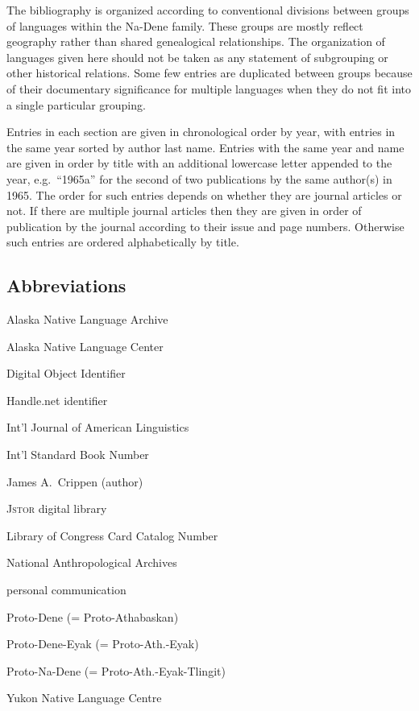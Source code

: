 \documentclass[12pt,letterpaper,oneside,article]{memoir}
\begin{document}
The bibliography is organized according to conventional divisions between groups of languages within the Na-Dene family.
These groups are mostly reflect geography rather than shared genealogical relationships.
The organization of languages given here should not be taken as any statement of subgrouping or other historical relations.
Some few entries are duplicated between groups because of their documentary significance for multiple languages when they do not fit into a single particular grouping.

Entries in each section are given in chronological order by year, with entries in the same year sorted by author last name.
Entries with the same year and name are given in order by title with an additional lowercase letter appended to the year, e.g.\ “1965a” for the second of two publications by the same author(s) in 1965.
The order for such entries depends on whether they are journal articles or not.
If there are multiple journal articles then they are given in order of publication by the journal according to their issue and page numbers.
Otherwise such entries are ordered alphabetically by title.

\subsection*{Abbreviations}
\begin{multicols}{2}\small\raggedyright
\begin{description}
	[font=\normalfont,
	leftmargin=3.5em,
	style=sameline,
	partopsep=0pt,
	parsep=0pt,
	itemsep=0pt]
\item[ANLA]		Alaska Native Language Archive
\item[ANLC]		Alaska Native Language Center
\item[DOI]		Digital Object Identifier
\item[HDL]		Handle.net identifier
\item[IJAL]		Int’l Journal of American Linguistics
\item[ISBN]		Int’l Standard Book Number
\item[JAC]		James A.~Crippen (author)
\item[JSTOR]		\textsc{Jstor} digital library
\item[LCCCN]		Library of Congress Card Catalog Number
\item[NAA]		National Anthropological Archives
\item[p.c.]		personal communication
\item[PD]		Proto-Dene (= Proto-Athabaskan)
\item[PDE]		Proto-Dene-Eyak (= Proto-Ath.-Eyak)
\item[PND]		Proto-Na-Dene (= Proto-Ath.-Eyak-Tlingit)
\item[YNLC]		Yukon Native Language Centre
\end{description}
\end{multicols}
\end{document}
